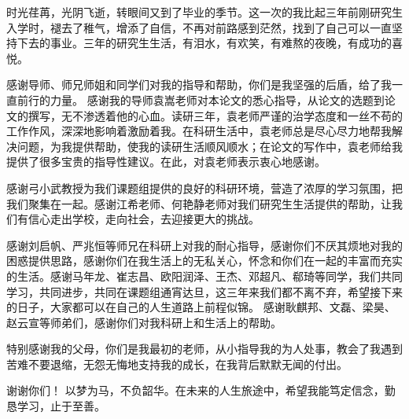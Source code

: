 
时光荏苒，光阴飞逝，转眼间又到了毕业的季节。这一次的我比起三年前刚研究生入学时，褪去了稚气，增添了自信，不再对前路感到茫然，找到了自己可以一直坚持下去的事业。三年的研究生生活，有泪水，有欢笑，有难熬的夜晚，有成功的喜悦。

感谢导师、师兄师姐和同学们对我的指导和帮助，你们是我坚强的后盾，给了我一直前行的力量。 感谢我的导师袁嵩老师对本论文的悉心指导，从论文的选题到论文的撰写，无不渗透着他的心血。读研三年，袁老师严谨的治学态度和一丝不苟的工作作风，深深地影响着激励着我。在科研生活中，袁老师总是尽心尽力地帮我解决问题，为我提供帮助，使我的读研生活顺风顺水；在论文的写作中，袁老师给我提供了很多宝贵的指导性建议。在此，对袁老师表示衷心地感谢。 

感谢弓小武教授为我们课题组提供的良好的科研环境，营造了浓厚的学习氛围，把我们聚集在一起。感谢江希老师、何艳静老师对我们研究生生活提供的帮助，让我们有信心走出学校，走向社会，去迎接更大的挑战。 

感谢刘启帆、严兆恒等师兄在科研上对我的耐心指导，感谢你们不厌其烦地对我的困惑提供思路，感谢你们在我生活上的无私关心，怀念和你们在一起的丰富而充实的生活。感谢马年龙、崔志昌、欧阳润泽、王杰、邓超凡、郗琦等同学，我们共同学习，共同进步，共同在课题组通宵达旦，这三年来我们都不离不弃，希望接下来的日子，大家都可以在自己的人生道路上前程似锦。 感谢耿麒邦、文磊、梁昊、赵云宣等师弟们，感谢你们对我科研上和生活上的帮助。 

特别感谢我的父母，你们是我最初的老师，从小指导我的为人处事，教会了我遇到苦难不要退缩，无怨无悔地支持我的成长，在我背后默默无闻的付出。

谢谢你们！ 以梦为马，不负韶华。在未来的人生旅途中，希望我能笃定信念，勤恳学习，止于至善。

